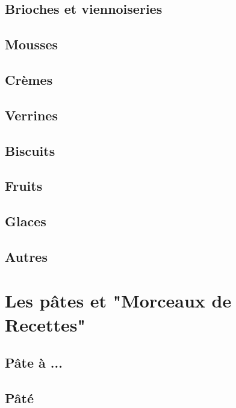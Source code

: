 \documentclass[A4paper,twoside, 12pt]{book}
\begin{document}
	\chapter{Brioches et viennoiseries}



	\chapter{Mousses}
	\chapter{Cr\`emes}

	\chapter{Verrines}
	
	\chapter{Biscuits}


	\chapter{Fruits}

	\chapter{Glaces}
	\chapter{Autres}




\part{Les p\^ates et "Morceaux de Recettes"}
	\chapter{P\^ate à ...}




	\chapter{P\^at\'e}
\end{document}

